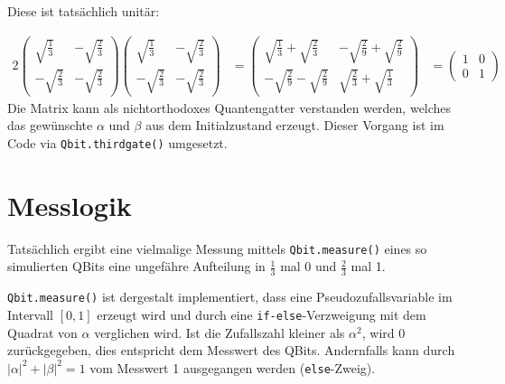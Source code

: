 Diese ist tatsächlich unitär:

\begin{alignat}{2}
    \begin{pmatrix}
        \sqrt{\frac{1}{3}} & -\sqrt{\frac{2}{3}} \\
        -\sqrt{\frac{2}{3}} & -\sqrt{\frac{2}{3}} 
    \end{pmatrix}
    \begin{pmatrix}
        \sqrt{\frac{1}{3}} & -\sqrt{\frac{2}{3}} \\
        -\sqrt{\frac{2}{3}} & -\sqrt{\frac{2}{3}} 
    \end{pmatrix}
    &=
    \begin{pmatrix}
        \sqrt{\frac{1}{3}}+\sqrt{\frac{2}{3}} & -\sqrt{\frac{2}{9}} + \sqrt{\frac{2}{9}} \\
        -\sqrt{\frac{2}{9}} - \sqrt{\frac{2}{9}} & \sqrt{\frac{2}{3}} + \sqrt{\frac{1}{3}}  
    \end{pmatrix}
    &=
    \begin{pmatrix}
        1 & 0 \\
        0 & 1 
    \end{pmatrix}
\end{alignat}
Die Matrix kann als nichtorthodoxes Quantengatter verstanden werden, welches das gewünschte $\alpha$ und $\beta$ aus dem Initialzustand erzeugt.
Dieser Vorgang ist im Code via \texttt{Qbit.thirdgate()} umgesetzt.

\section{Messlogik}
Tatsächlich ergibt eine vielmalige Messung mittels \texttt{Qbit.measure()} eines so simulierten QBits eine ungefähre Aufteilung in $\frac{1}{3}$ mal 0 und $\frac{2}{3}$ mal 1.

\texttt{Qbit.measure()} ist dergestalt implementiert, dass eine Pseudozufallsvariable im Intervall $\left[0,1\right]$ erzeugt wird und durch eine \texttt{if-else}-Verzweigung mit dem Quadrat von $\alpha$ verglichen wird.
Ist die Zufallszahl kleiner als $\alpha^2$, wird 0 zurückgegeben, dies entspricht dem Messwert des QBits.
Andernfalls kann durch $\left\lvert \alpha \right\rvert ^2 + \left\lvert \beta \right\rvert ^2 = 1$ vom Messwert 1 ausgegangen werden (\texttt{else}-Zweig).

